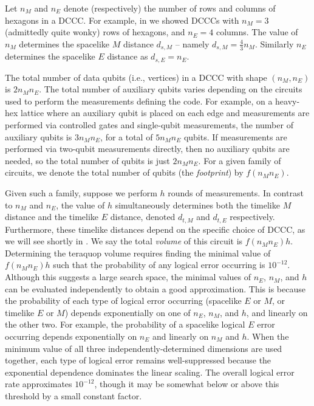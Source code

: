 Let $n_M$ and $n_E$ denote (respectively) the number of rows and columns of hexagons in a DCCC.
For example, in  we showed DCCCs with $n_M = 3$ (admittedly quite wonky) rows of hexagons, and $n_E = 4$ columns.
The value of $n_M$ determines the spacelike $M$ distance $d_{s,M}$ -- namely $d_{s,M} = \frac{4}{3}n_M$.
Similarly $n_E$ determines the spacelike $E$ distance as $d_{s,E} = n_E$.

The total number of data qubits (i.e., vertices) in a DCCC with shape $(n_M, n_E)$ is $2 n_M n_E$.
The total number of auxiliary qubits varies depending on the circuits used to perform the measurements defining the code.
For example, on a heavy-hex lattice where an auxiliary qubit is placed on each edge and measurements are performed via controlled gates and single-qubit measurements, the number of auxiliary qubits is $3 n_M n_E$, for a total of $5 n_M n_E$ qubits.
If measurements are performed via two-qubit measurements directly, then no auxiliary qubits are needed, so the total number of qubits is just $2 n_M n_E$.
For a given family of circuits, we denote the total number of qubits (the \textit{footprint}) by $f(n_M n_E)$.

Given such a family, suppose we perform $h$ rounds of measurements.
In contrast to $n_M$ and $n_E$, the value of $h$ simultaneously determines both the timelike $M$ distance and the timelike $E$ distance, denoted $d_{t,M}$ and $d_{t,E}$ respectively.
Furthermore, these timelike distances depend on the specific choice of DCCC, as we will see shortly in .
We say the total \textit{volume} of this circuit is $f(n_M n_E) h$.
Determining the teraquop volume requires finding the minimal value of $f(n_M n_E) h$ such that the probability of any logical error occurring is $10^{-12}$.
Although this suggests a large search space, the minimal values of $n_E$, $n_M$, and $h$ can be evaluated independently to obtain a good approximation.
This is because the probability of each type of logical error occurring (spacelike $E$ or $M$, or timelike $E$ or $M$) depends exponentially on one of $n_E$, $n_M$, and $h$, and linearly on the other two.
For example, the probability of a spacelike logical $E$ error occurring depends exponentially on $n_E$ and linearly on $n_M$ and $h$.
When the minimum value of all three independently-determined dimensions are used together, each type of logical error remains well-suppressed because the exponential dependence dominates the linear scaling.
The overall logical error rate approximates $10^{-12}$, though it may be somewhat below or above this threshold by a small constant factor.

